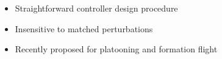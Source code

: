\documentclass[]{beamer}
\begin{document}

\begin{frame}\frametitle{}
\centering

\begin{tcolorbox}[colback=blue!5!white,colframe=blue!75!black,title=Ideal Sliding Mode Control, width=20em,
standard jigsaw,
opacityback=.7]
\begin{itemize}
\item Straightforward controller design procedure
\item Insensitive to {matched} perturbations
\item Recently proposed for platooning \cite{Fahimi2007} and formation flight \cite{galzi2006uav}
\end{itemize}
\end{tcolorbox}

\end{frame}
\end{document}

